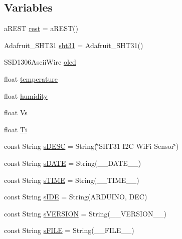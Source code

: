 \subsection*{Variables}
\begin{DoxyCompactItemize}
\item 
a\-R\-E\-S\-T \hyperlink{Yun__SHT31__WiFi__REST_8ino_a26fae33ed4ee26417d9384858ac417f7}{rest} = a\-R\-E\-S\-T()
\item 
Adafruit\-\_\-\-S\-H\-T31 \hyperlink{Yun__SHT31__WiFi__REST_8ino_a4cc868f67bc519384a9e92cd96d408c9}{sht31} = Adafruit\-\_\-\-S\-H\-T31()
\item 
S\-S\-D1306\-Ascii\-Wire \hyperlink{Yun__SHT31__WiFi__REST_8ino_ad5f8b489b649f5974de70af2a799aee4}{oled}
\item 
float \hyperlink{Yun__SHT31__WiFi__REST_8ino_afc1d28cfbce795d6ea954ebe725241f5}{temperature}
\item 
float \hyperlink{Yun__SHT31__WiFi__REST_8ino_a6a87b2b0cff24d38b367ccd34843a206}{humidity}
\item 
float \hyperlink{Yun__SHT31__WiFi__REST_8ino_a330b84cf62d5ff4d105603b4aeb5b0f4}{Vs}
\item 
float \hyperlink{Yun__SHT31__WiFi__REST_8ino_a020447fde7d6f0d08fcf2f0d937dac8b}{Ti}
\item 
const String \hyperlink{Yun__SHT31__WiFi__REST_8ino_af834f051d722dbb35b72622ba5b6e7f0}{s\-D\-E\-S\-C} = String(\char`\"{}S\-H\-T31 I2\-C Wi\-Fi Sensor\char`\"{})
\item 
const String \hyperlink{Yun__SHT31__WiFi__REST_8ino_aebbbc07d1cec3118849700c029385aca}{s\-D\-A\-T\-E} = String(\-\_\-\-\_\-\-D\-A\-T\-E\-\_\-\-\_\-)
\item 
const String \hyperlink{Yun__SHT31__WiFi__REST_8ino_aaba6e31d86fe58b0db043f3b487b29ff}{s\-T\-I\-M\-E} = String(\-\_\-\-\_\-\-T\-I\-M\-E\-\_\-\-\_\-)
\item 
const String \hyperlink{Yun__SHT31__WiFi__REST_8ino_a00e4b83e0d8cd98e4f68b1517fa4c815}{s\-I\-D\-E} = String(A\-R\-D\-U\-I\-N\-O, D\-E\-C)
\item 
const String \hyperlink{Yun__SHT31__WiFi__REST_8ino_a0a1aeee9eb1bf0a5b6fee51ac230a8f6}{s\-V\-E\-R\-S\-I\-O\-N} = String(\-\_\-\-\_\-\-V\-E\-R\-S\-I\-O\-N\-\_\-\-\_\-)
\item 
const String \hyperlink{Yun__SHT31__WiFi__REST_8ino_a71fe64d7daf0e26886ad2d7e17bd0806}{s\-F\-I\-L\-E} = String(\-\_\-\-\_\-\-F\-I\-L\-E\-\_\-\-\_\-)
\end{DoxyCompactItemize}


